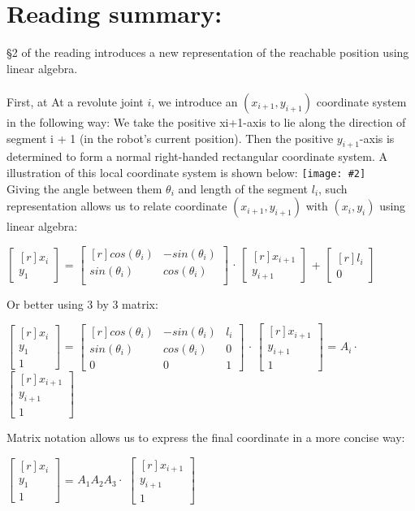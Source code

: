 \documentclass[11pt]{article}
\newcommand{\image}[2]{\texttt{[image: \#2]}}
\newcommand{\mat}[1]{
    $\begin{bmatrix*}[r]
        #1
    \end{bmatrix*}$
} %
\begin{document}
\section{Reading summary:}
§2 of the reading introduces a new representation of the reachable position using linear algebra. \\
\\
First, at At a revolute joint $i$, we introduce an $(x_{i+1}, y_{i+1})$ coordinate system in the following way:
We take the positive xi+1-axis to lie along
the direction of segment i + 1 (in the robot's current position). Then the positive
$y_{i+1}$-axis is determined to form a normal right-handed rectangular coordinate system. A illustration of this local coordinate system is shown below:
\image{0.6}{img2} \\
Giving the angle between them $\theta_i$ and length of the segment $l_i$,
such representation allows us to relate coordinate $(x_{i+1}, y_{i+1})$ with $(x_i, y_i)$ using linear algebra:
\begin{center}
  \mat{
    x_i \\
    y_1
  } = \mat{
    cos(\theta_i) & -sin(\theta_i) \\
    sin(\theta_i) & cos(\theta_i) \\
  } $\cdot$ \mat{
    x_{i+1} \\
    y_{i+1}
  } + \mat{
    l_i \\
    0
  }
\end{center}
Or better using 3 by 3 matrix:
\begin{center}
  \mat{
    x_i \\
    y_1 \\
    1
  } = \mat{
    cos(\theta_i) & -sin(\theta_i) & l_i \\
    sin(\theta_i) & cos(\theta_i) & 0 \\
    0 & 0 & 1
  } $\cdot$ \mat{
    x_{i+1} \\
    y_{i+1} \\
    1
  } = $A_i \cdot$ \mat{
    x_{i+1} \\
    y_{i+1} \\
    1
  }
\end{center}
Matrix notation allows us to express the final coordinate in a more concise way:
\begin{center}
  \mat{
    x_i \\
    y_1 \\
    1
  } = $A_1A_2A_3 \cdot$ \mat{
    x_{i+1} \\
    y_{i+1} \\
    1
  } \\
\end{center}
\end{document}
